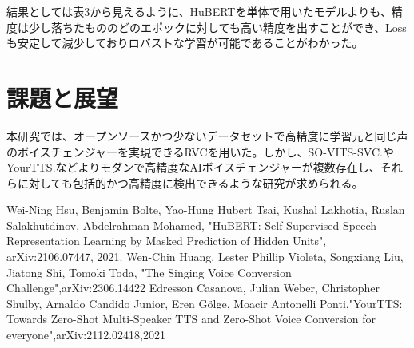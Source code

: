 \documentclass[10pt]{ltjsarticle}
\begin{document}
結果としては表3から見えるように、HuBERTを単体で用いたモデルよりも、精度は少し落ちたもののどのエポックに対しても高い精度を出すことができ、Lossも安定して減少しておりロバストな学習が可能であることがわかった。

\section{課題と展望}
本研究では、オープンソースかつ少ないデータセットで高精度に学習元と同じ声のボイスチェンジャーを実現できるRVCを用いた。しかし、SO-VITS-SVC\cite{SO-VITS-SVC}.やYourTTS\cite{YourTTS}.などよりモダンで高精度なAIボイスチェンジャーが複数存在し、それらに対しても包括的かつ高精度に検出できるような研究が求められる。

\begin{thebibliography}{99}
   Wei-Ning Hsu, Benjamin Bolte, Yao-Hung Hubert Tsai, Kushal Lakhotia, Ruslan Salakhutdinov, Abdelrahman Mohamed, 
  "HuBERT: Self-Supervised Speech Representation Learning by Masked Prediction of Hidden Units", 
  arXiv:2106.07447, 2021.
   Wen-Chin Huang, Lester Phillip Violeta, Songxiang Liu, Jiatong Shi, Tomoki Toda, "The Singing Voice Conversion Challenge",arXiv:2306.14422
  Edresson Casanova, Julian Weber, Christopher Shulby, Arnaldo Candido Junior, Eren Gölge, Moacir Antonelli Ponti,"YourTTS: Towards Zero-Shot Multi-Speaker TTS and Zero-Shot Voice Conversion for everyone",arXiv:2112.02418,2021

\end{thebibliography}
\end{document}

